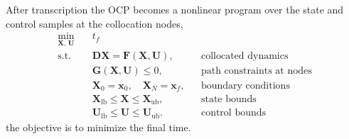 After transcription the OCP becomes a nonlinear program over the state and
control samples at the collocation nodes,
\begin{equation}
    \begin{aligned}
        \min_{\mathbf{X},\,\mathbf{U}}\quad
            & t_f \\
        \text{s.t.}\quad
            & \mathbf{D}\mathbf{X} = \mathbf{F}(\mathbf{X}, \mathbf{U}),
              && \text{collocated dynamics} \\
            & \mathbf{G}(\mathbf{X}, \mathbf{U}) \le 0,
              && \text{path constraints at nodes} \\
            & \mathbf{X}_0 = \mathbf{x}_0,\quad \mathbf{X}_N = \mathbf{x}_f,
              && \text{boundary conditions} \\
            & \mathbf{X}_\mathrm{lb} \le \mathbf{X} \le \mathbf{X}_\mathrm{ub},
              && \text{state bounds} \\
            & \mathbf{U}_\mathrm{lb} \le \mathbf{U} \le \mathbf{U}_\mathrm{ub}.
              && \text{control bounds}
    \end{aligned}
\end{equation}
the objective is to minimize the final time.

